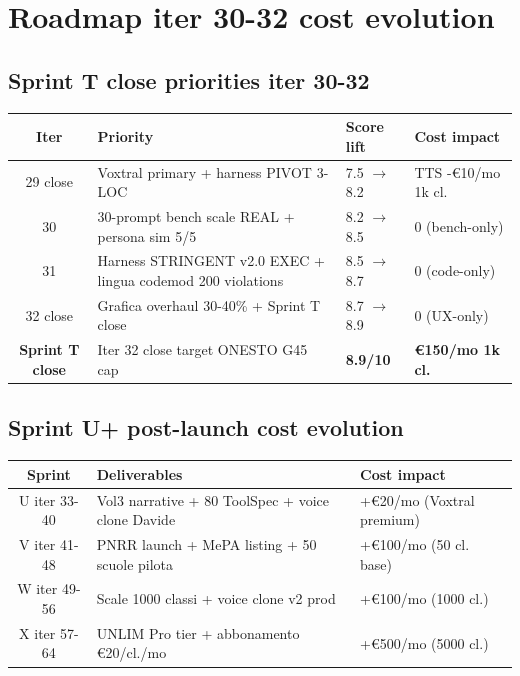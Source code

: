 \documentclass[12pt,a4paper]{article}
\begin{document}
\section{Roadmap iter 30-32 cost evolution}

\subsection{Sprint T close priorities iter 30-32}

\begin{center}
\renewcommand{\arraystretch}{1.2}
\begin{tabular}{c p{6cm} p{2.0cm} p{2.5cm}}
\toprule
\textbf{Iter} & \textbf{Priority} & \textbf{Score lift} & \textbf{Cost impact} \\
\midrule
29 close & Voxtral primary + harness PIVOT 3-LOC & 7.5 $\rightarrow$ 8.2 & TTS -€10/mo 1k cl. \\
30 & 30-prompt bench scale REAL + persona sim 5/5 & 8.2 $\rightarrow$ 8.5 & 0 (bench-only) \\
31 & Harness STRINGENT v2.0 EXEC + lingua codemod 200 violations & 8.5 $\rightarrow$ 8.7 & 0 (code-only) \\
32 close & Grafica overhaul 30-40\% + Sprint T close & 8.7 $\rightarrow$ 8.9 & 0 (UX-only) \\
\midrule
\textbf{Sprint T close} & Iter 32 close target ONESTO G45 cap & \textbf{8.9/10} & \textbf{€150/mo 1k cl.} \\
\bottomrule
\end{tabular}
\end{center}

\subsection{Sprint U+ post-launch cost evolution}

\begin{center}
\begin{tabular}{c p{6cm} p{4cm}}
\toprule
\textbf{Sprint} & \textbf{Deliverables} & \textbf{Cost impact} \\
\midrule
U iter 33-40 & Vol3 narrative + 80 ToolSpec + voice clone Davide & +€20/mo (Voxtral premium) \\
V iter 41-48 & PNRR launch + MePA listing + 50 scuole pilota & +€100/mo (50 cl. base) \\
W iter 49-56 & Scale 1000 classi + voice clone v2 prod & +€100/mo (1000 cl.) \\
X iter 57-64 & UNLIM Pro tier + abbonamento €20/cl./mo & +€500/mo (5000 cl.) \\
\bottomrule
\end{tabular}
\end{center}
\end{document}
